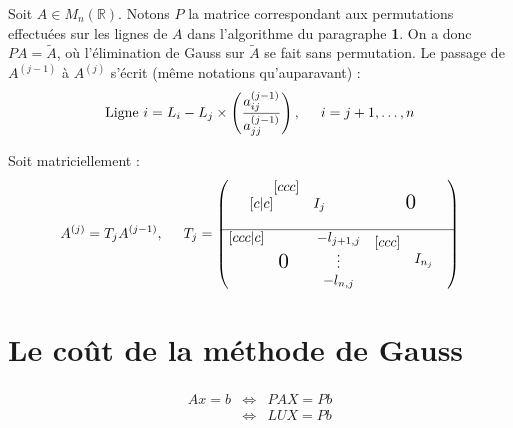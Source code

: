 \documentclass[a4paper,11pt]{article}
\newcommand{\R}{\mathbb{R}}
\theoremstyle{plain} %
\begin{document}
Soit $A \in M_n(\R)$. Notons $P$ la matrice correspondant aux permutations effectuées sur les lignes de $A$ dans l'algorithme du paragraphe \textbf{1}.
On a donc $PA = \tilde{A}$, où l'élimination de Gauss sur $\tilde{A}$ se fait sans permutation. Le passage de $A^{(j-1)}$ à $A^{(j)}$ s'écrit (même notations qu'auparavant) : 
\[
    \text{Ligne $i$} = L_i - L_j \times \left( \frac{a^{(j-1)}_{ij}}{a^{(j-1)}_{jj}} \right), \hspace{0.5cm} i = j+1, \dots , n
\]

Soit matriciellement :
\[
    A^{(j)} = T_j A^{(j-1)}, \hspace{0.5cm} T_j =
    \begin{pmatrix}[c|c]
        \begin{matrix}[ccc]
        & & \\
        & I_j & \\
        & & \\
        \end{matrix} 
        &
        \begin{matrix}
            \scalebox{1.5}{0}
        \end{matrix}
        \\ \hline
        \begin{matrix}[ccc|c]
            & & & -l_{j+1,j} \\
            & \scalebox{1.5}{0} & & \vdots \\
            & & & -l_{n,j}
        \end{matrix}
        &
        \begin{matrix}[ccc]
        & & \\
        & I_{n_j} & \\
        & & \\
        \end{matrix} 
    \end{pmatrix}
\]

\section{Le coût de la méthode de Gauss}

\begin{eqnarray}
    \begin{split}
        Ax = b & \Leftrightarrow & PAX = Pb \\
        & \Leftrightarrow & LUX = Pb
    \end{split}
    \label{S1}
\end{eqnarray}
\end{document}

